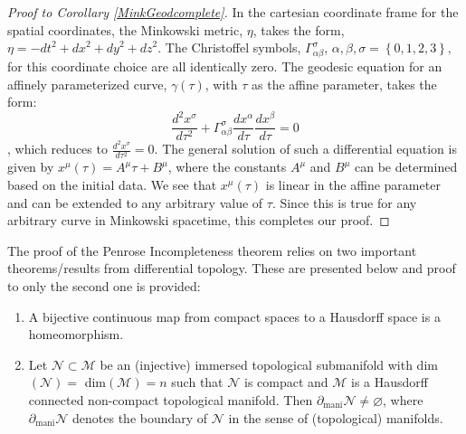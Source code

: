\documentclass[12pt, a4paper]{report}
\theoremstyle{bfnote}
\begin{document}
\begin{proof}[Proof to Corollary \ref{MinkGeodcomplete}] 
    In the cartesian coordinate frame for the spatial coordinates, the Minkowski
    metric, $\eta$, takes the form, $\eta = -\textit{dt}^2 + \textit{dx}^2 +
    \textit{dy}^2 + \textit{dz}^2$. The Christoffel symbols,
    $\Gamma^{\sigma}_{\alpha\beta}$, $\alpha, \beta, \sigma = \left\{0, 1, 2,
    3\right\}$, for this coordinate choice are all identically zero. The geodesic
    equation for an affinely parameterized curve, $\gamma\left(\tau\right)$,
    with $\tau$ as the affine parameter, takes the form:
    \begin{equation*}
        \frac{d^2 x^\sigma}{d\tau^2} + \Gamma^{\sigma}_{\alpha\beta}\frac{dx^\alpha}{d\tau}\dfrac{dx^\beta}{d\tau} = 0
    \end{equation*}
    , which reduces to {\large{$\frac{d^2 x^\sigma}{d\tau^2} = 0$}}. The general
    solution of such a differential equation is given by
    $x^{\mu}\left(\tau\right) = A^\mu \tau + B^\mu$, where the constants $A^\mu$
    and $B^\mu$ can be determined based on the initial data. We see that
    $x^\mu\left(\tau\right)$ is linear in the affine parameter and can be
    extended to any arbitrary value of $\tau$. Since this is true for any
    arbitrary curve in Minkowski spacetime, this completes our proof.
\end{proof}

The proof of the Penrose Incompleteness theorem relies on two important
theorems/results from differential topology. These are presented below and proof
to only the second one is provided:
\begin{enumerate}[leftmargin=*, label={\bfseries{Ingredient theorem (\roman*)}}]
	\item \label{topologicaltheorem1} A bijective continuous map from compact
	spaces to a Hausdorff space is a homeomorphism.
	\item \label{topologicaltheorem2} Let $\mathcal{N} \subset \mathcal{M}$ be
	an (injective) immersed topological submanifold with
	dim$\left(\mathcal{N}\right) = $ dim$\left(\mathcal{M}\right) = n$ such that
	$\mathcal{N}$ is compact and $\mathcal{M}$ is a Hausdorff connected
	non-compact topological manifold. Then $\partial_{\text{mani}}\mathcal{N} \neq
	\varnothing$, where $\partial_{\text{mani}}\mathcal{N}$ denotes the boundary
	of $\mathcal{N}$ in the sense of (topological) manifolds.
\end{enumerate}
\end{document}
